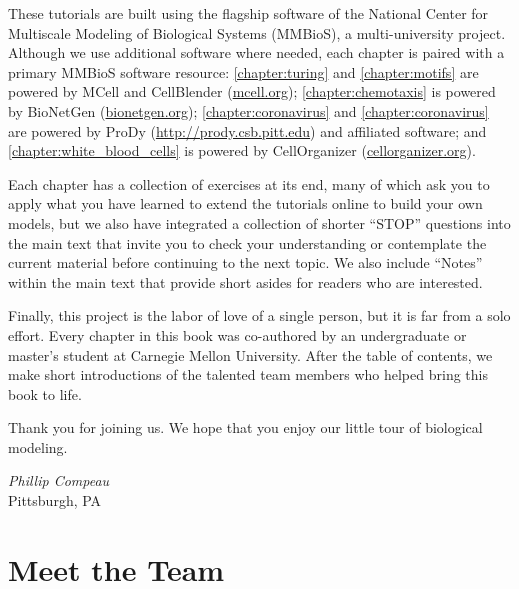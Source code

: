 These tutorials are built using the flagship software of the National Center for Multiscale Modeling of Biological Systems (MMBioS), a multi-university project. Although we use additional software where needed, each chapter is paired with a primary MMBioS software resource: \autoref{chapter:turing} and \autoref{chapter:motifs} are powered by MCell and CellBlender (\url{mcell.org}); \autoref{chapter:chemotaxis} is powered by BioNetGen (\url{bionetgen.org}); \autoref{chapter:coronavirus} and \autoref{chapter:coronavirus} are powered by ProDy (\url{http://prody.csb.pitt.edu}) and affiliated software; and \autoref{chapter:white_blood_cells} is powered by CellOrganizer (\url{cellorganizer.org}).

Each chapter has a collection of exercises at its end, many of which ask you to apply what you have learned to extend the tutorials online to build your own models, but we also have integrated a collection of shorter ``STOP'' questions into the main text that invite you to check your understanding or contemplate the current material before continuing to the next topic. We also include ``Notes'' within the main text that provide short asides for readers who are interested.

Finally, this project is the labor of love of a single person, but it is far from a solo effort. Every chapter in this book was co-authored by an undergraduate or master's student at Carnegie Mellon University. After the table of contents, we make short introductions of the talented team members who helped bring this book to life.

Thank you for joining us. We hope that you enjoy our little tour of biological modeling.

\begin{flushright}
\textit{Phillip Compeau}\\
{Pittsburgh, PA}
\end{flushright}

\phantom{}\vspace{7.7\baselineskip}

\newpage

\tableofcontents*
\clearpage
{}


\newpage
{}
\chapter{Meet the Team}

